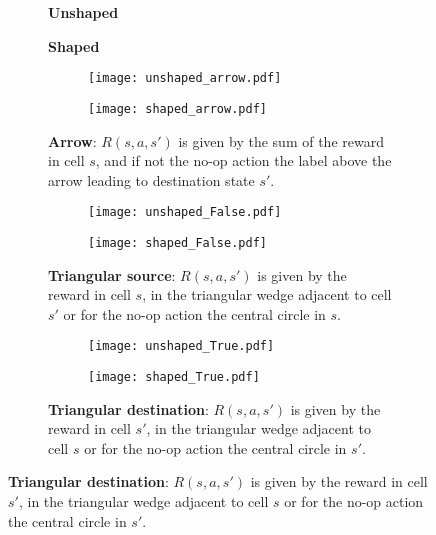 \documentclass{article}
\begin{document}
	\begin{figure}
		\centering
		\begin{subfigure}{0.49\textwidth}
			\centering
			\textbf{Unshaped}
		\end{subfigure}
		\begin{subfigure}{0.49\textwidth}
			\centering
			\textbf{Shaped}
		\end{subfigure}
		\begin{subfigure}{\textwidth}
			\begin{subfigure}{0.49\textwidth}
				\centering
				\texttt{[image: unshaped\_arrow.pdf]}
			\end{subfigure}
			\begin{subfigure}{0.49\textwidth}
				\centering
				\texttt{[image: shaped\_arrow.pdf]}
			\end{subfigure}
			\caption{\textbf{Arrow}: $R(s,a,s')$ is given by the sum of the reward in cell $s$, and if not the no-op action the label above the arrow leading to destination state $s'$.}
		\end{subfigure}
		\begin{subfigure}{\textwidth}
			\begin{subfigure}{0.49\textwidth}
				\centering			
				\texttt{[image: unshaped\_False.pdf]}
			\end{subfigure}
			\begin{subfigure}{0.49\textwidth}
				\centering
				\texttt{[image: shaped\_False.pdf]}
			\end{subfigure}
			\caption{\textbf{Triangular source}: $R(s,a,s')$ is given by the reward in cell $s$, in the triangular wedge adjacent to cell $s'$ or for the no-op action the central circle in $s$.}
		\end{subfigure}
		\begin{subfigure}{\textwidth}
			\begin{subfigure}{0.49\textwidth}
				\centering
				\texttt{[image: unshaped\_True.pdf]}
			\end{subfigure}
			\begin{subfigure}{0.49\textwidth}
				\centering			
				\texttt{[image: shaped\_True.pdf]}
			\end{subfigure}
			\caption{\textbf{Triangular destination}: $R(s,a,s')$ is given by the reward in cell $s'$, in the triangular wedge adjacent to cell $s$ or for the no-op action the central circle in $s'$.}
		\end{subfigure}
	\end{figure}
\end{document}
